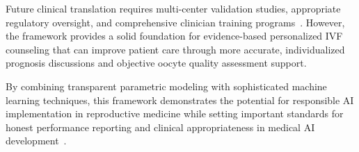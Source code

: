 Future clinical translation requires multi-center validation studies, appropriate regulatory oversight, and comprehensive clinician training programs~\cite{fda2021ai,fda2022clinical,varoquaux2022machine}. However, the framework provides a solid foundation for evidence-based personalized IVF counseling that can improve patient care through more accurate, individualized prognosis discussions and objective oocyte quality assessment support.

By combining transparent parametric modeling with sophisticated machine learning techniques, this framework demonstrates the potential for responsible AI implementation in reproductive medicine while setting important standards for honest performance reporting and clinical appropriateness in medical AI development~\cite{topol2019high,litjens2017survey}. 